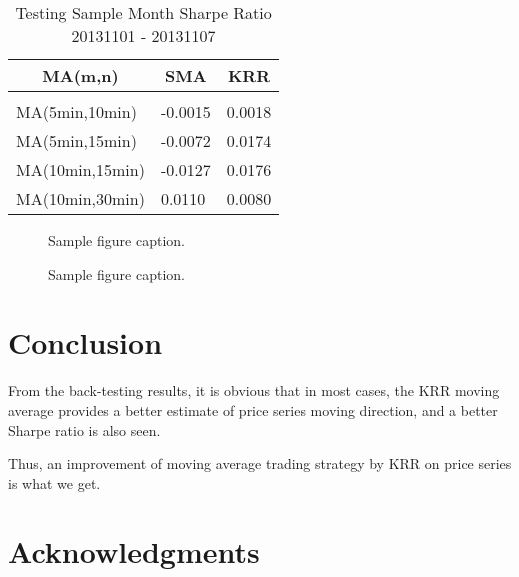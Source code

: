 \documentclass{article} %
\begin{document}
\begin{table}[H]
\caption{Testing Sample Month Sharpe Ratio 20131101 - 20131107}
\label{Table 4}
\begin{center}
\begin{tabular}{l | l l}
\multicolumn{1}{c}{\bf MA(m,n)}  &\multicolumn{1}{c}{\bf SMA} & \multicolumn{1}{c}{\bf KRR}
\\ \hline \\
MA(5min,10min) &   -0.0015     & 0.0018 \\
MA(5min,15min) &   -0.0072     & 0.0174 \\
MA(10min,15min) &  -0.0127    & 0.0176\\
MA(10min,30min) &   0.0110    & 0.0080\\

\end{tabular}
\end{center}
\end{table}

\begin{figure}[H]
\begin{center}
\end{center}
\caption{Sample figure caption.}
\end{figure}

\begin{figure}[H]
\begin{center}
\end{center}
\caption{Sample figure caption.}
\end{figure}

\section{Conclusion}

From the back-testing results, it is obvious that in most cases, the KRR moving average provides a better estimate of price series moving direction, and a better Sharpe ratio is also seen. 

Thus, an improvement of moving average trading strategy by KRR on price series is what we get.





\section*{Acknowledgments}
\end{document}
